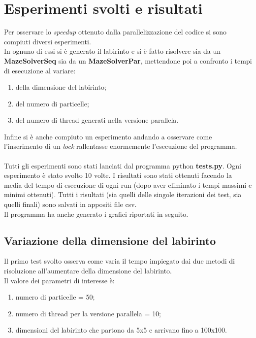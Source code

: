 \documentclass[10pt,twocolumn,letterpaper]{article}
\begin{document}
\section{Esperimenti svolti e risultati}
Per osservare lo \textit{speedup} ottenuto dalla parallelizzazione del codice si sono compiuti diversi esperimenti.\\
In ognuno di essi si è generato il labirinto e si è fatto risolvere sia da un \textbf{MazeSolverSeq} sia da un \textbf{MazeSolverPar}, mettendone poi a confronto i tempi di esecuzione al variare:
\begin{enumerate}
\item{della dimensione del labirinto;}
\item{del numero di particelle;}
\item{del numero di thread generati nella versione parallela.}
\end{enumerate}
Infine si è anche compiuto un esperimento andando a osservare come l'inserimento di un \textit{lock} rallentasse enormemente l'esecuzione del programma.\\
\\
Tutti gli esperimenti sono stati lanciati dal programma python \textbf{tests.py}. Ogni esperimento è stato svolto 10 volte. I risultati sono stati ottenuti facendo la media del tempo di esecuzione di ogni run (dopo aver eliminato i tempi massimi e minimi ottenuti). Tutti i risultati (sia quelli delle singole iterazioni dei test, sia quelli finali) sono salvati in appositi file csv.\\
Il programma ha anche generato i grafici riportati in seguito. 

\subsection{Variazione della dimensione del labirinto}

Il primo test svolto osserva come varia il tempo impiegato dai due metodi di risoluzione all'aumentare della dimensione del labirinto.\\
Il valore dei parametri di interesse è:
\begin{enumerate}[-]
\item{numero di particelle = 50;}
\item{numero di thread per la versione parallela = 10;}
\item{dimensioni del labirinto che partono da 5x5 e arrivano fino a 100x100.}
\end{enumerate}
\end{document}
